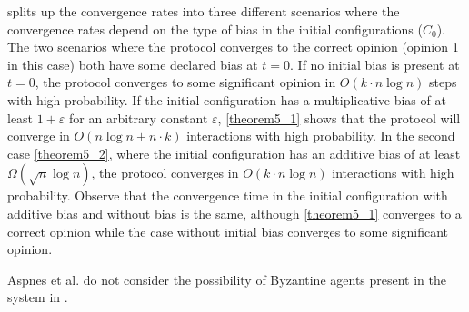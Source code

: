   splits up the convergence rates into three different scenarios where the convergence rates depend on the type of bias in the initial configurations ($C_0$). The two scenarios where the protocol converges to the correct opinion (opinion 1 in this case) both have some declared bias at $t = 0$. If no initial bias is present at $t = 0$, the protocol converges to some significant opinion in $O(k \cdot n \log n)$ steps with high probability. If the initial configuration has a multiplicative bias of at least $1 + \varepsilon$ for an arbitrary constant $\varepsilon$, \ref{theorem5_1} shows that the protocol will converge in $O(n \log n + n \cdot k)$ interactions with high probability. In the second case \ref{theorem5_2}, where the initial configuration has an additive bias of at least $\Omega(\sqrt{n} \log n)$, the protocol converges in $O(k \cdot n \log n)$ interactions with high probability. Observe that the convergence time in the initial configuration with additive bias and without bias is the same, although \ref{theorem5_1} converges to a correct opinion while the case without initial bias converges to some significant opinion. 

 Aspnes et al. do not consider the possibility of Byzantine agents present in the system in \cite{AspnesFastConverganceOfKOpinion2023}. 


